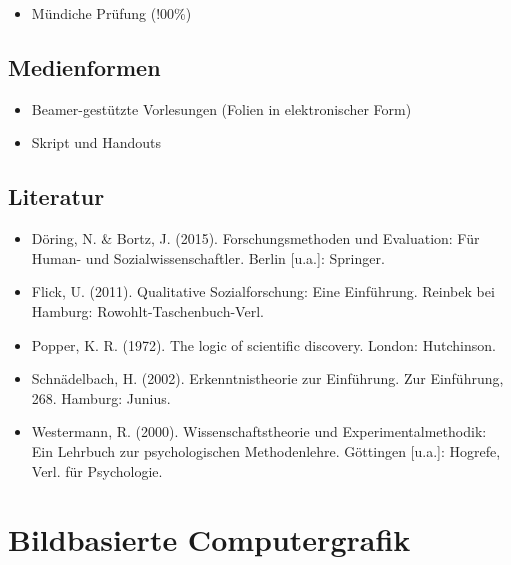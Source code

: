 \begin{itemize}
\tightlist
\item
  Mündiche Prüfung (!00\%)
\end{itemize}

\section*{Medienformen\label{/mi-2017/modulbeschreibungen-master/MA_SC_WPF_eScience}}\label{medienformenpathlabelmi-2017modulbeschreibungen-mastermaux5fscux5fwpfux5fescience}

\begin{itemize}
\tightlist
\item
  Beamer-gestützte Vorlesungen (Folien in elektronischer Form)
\item
  Skript und Handouts
\end{itemize}

\section*{Literatur\label{/mi-2017/modulbeschreibungen-master/MA_SC_WPF_eScience}}\label{literaturpathlabelmi-2017modulbeschreibungen-mastermaux5fscux5fwpfux5fescience}

\begin{itemize}
\tightlist
\item
  Döring, N. \& Bortz, J. (2015). Forschungsmethoden und Evaluation: Für
  Human- und Sozialwissenschaftler. Berlin {[}u.a.{]}: Springer.
\item
  Flick, U. (2011). Qualitative Sozialforschung: Eine Einführung.
  Reinbek bei Hamburg: Rowohlt-Taschenbuch-Verl.
\item
  Popper, K. R. (1972). The logic of scientific discovery. London:
  Hutchinson.
\item
  Schnädelbach, H. (2002). Erkenntnistheorie zur Einführung. Zur
  Einführung, 268. Hamburg: Junius.
\item
  Westermann, R. (2000). Wissenschaftstheorie und Experimentalmethodik:
  Ein Lehrbuch zur psychologischen Methodenlehre. Göttingen {[}u.a.{]}:
  Hogrefe, Verl. für Psychologie.
\end{itemize}

\chapter{Bildbasierte
Computergrafik\label{/mi-2017/modulbeschreibungen-master/MA_VC_Modul_BildbasierteComputergrafik}}\label{bildbasierte-computergrafikpathlabelmi-2017modulbeschreibungen-mastermaux5fvcux5fmodulux5fbildbasiertecomputergrafik}

